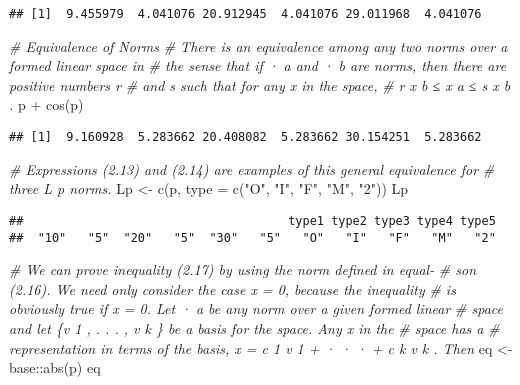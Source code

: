 \documentclass[
]{article}
\newenvironment{Shaded}{\begin{snugshade}}{\end{snugshade}}
\newcommand{\AttributeTok}[1]{\textcolor[rgb]{0.77,0.63,0.00}{#1}}
\newcommand{\CommentTok}[1]{\textcolor[rgb]{0.56,0.35,0.01}{\textit{#1}}}
\newcommand{\FunctionTok}[1]{\textcolor[rgb]{0.00,0.00,0.00}{#1}}
\newcommand{\NormalTok}[1]{#1}
\newcommand{\OtherTok}[1]{\textcolor[rgb]{0.56,0.35,0.01}{#1}}
\newcommand{\SpecialCharTok}[1]{\textcolor[rgb]{0.00,0.00,0.00}{#1}}
\newcommand{\StringTok}[1]{\textcolor[rgb]{0.31,0.60,0.02}{#1}}
\begin{document}
\begin{verbatim}
## [1]  9.455979  4.041076 20.912945  4.041076 29.011968  4.041076
\end{verbatim}

\begin{Shaded}
\begin{Highlighting}[]
\CommentTok{\# Equivalence of Norms}
\CommentTok{\# There is an equivalence among any two norms over a formed linear space in}
\CommentTok{\# the sense that if  ·  a and  ·  b are norms, then there are positive numbers r}
\CommentTok{\# and s such that for any x in the space,}
\CommentTok{\# r x b ≤ x a ≤ s x b .}
\NormalTok{p }\SpecialCharTok{+} \FunctionTok{cos}\NormalTok{(p)}
\end{Highlighting}
\end{Shaded}

\begin{verbatim}
## [1]  9.160928  5.283662 20.408082  5.283662 30.154251  5.283662
\end{verbatim}

\begin{Shaded}
\begin{Highlighting}[]
\CommentTok{\# Expressions (2.13) and (2.14) are examples of this general equivalence for}
\CommentTok{\# three L p norms.}
\NormalTok{Lp }\OtherTok{\textless{}{-}} \FunctionTok{c}\NormalTok{(p, }\AttributeTok{type =} \FunctionTok{c}\NormalTok{(}\StringTok{"O"}\NormalTok{, }\StringTok{"I"}\NormalTok{, }\StringTok{"F"}\NormalTok{, }\StringTok{"M"}\NormalTok{, }\StringTok{"2"}\NormalTok{))}
\NormalTok{Lp}
\end{Highlighting}
\end{Shaded}

\begin{verbatim}
##                                     type1 type2 type3 type4 type5 
##  "10"   "5"  "20"   "5"  "30"   "5"   "O"   "I"   "F"   "M"   "2"
\end{verbatim}

\begin{Shaded}
\begin{Highlighting}[]
\CommentTok{\# We can prove inequality (2.17) by using the norm defined in equal{-}}
\CommentTok{\# son (2.16). We need only consider the case x = 0, because the inequality}
\CommentTok{\# is obviously true if x = 0. Let  ·  a be any norm over a given formed linear}
\CommentTok{\# space and let \{v 1 , . . . , v k \} be a basis for the space. Any x in the }
\CommentTok{\# space has a}
\CommentTok{\# representation in terms of the basis, x = c 1 v 1 + · · · + c k v k . Then}
\NormalTok{eq }\OtherTok{\textless{}{-}}\NormalTok{ base}\SpecialCharTok{::}\FunctionTok{abs}\NormalTok{(p)}
\NormalTok{eq}
\end{Highlighting}
\end{Shaded}
\end{document}
